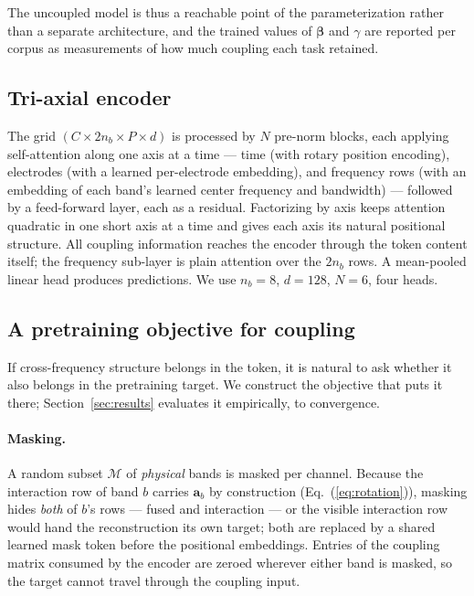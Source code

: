 The uncoupled model is thus a reachable point of the parameterization
rather than a separate architecture, and the trained values of
$\boldsymbol{\beta}$ and $\gamma$ are reported per corpus as measurements
of how much coupling each task retained.

\subsection{Tri-axial encoder}
\label{sec:encoder}

The grid $(C \times 2n_b \times P \times d)$ is processed by $N$ pre-norm
blocks, each applying self-attention along one axis at a time --- time
(with rotary position encoding), electrodes (with a learned per-electrode
embedding), and frequency rows (with an embedding of each band's learned
center frequency and bandwidth) --- followed by a feed-forward layer, each
as a residual. Factorizing by axis keeps attention quadratic in one short
axis at a time and gives each axis its natural positional structure. All
coupling information reaches the encoder through the token content itself;
the frequency sub-layer is plain attention over the $2n_b$ rows. A
mean-pooled linear head produces predictions. We use $n_b{=}8$, $d{=}128$,
$N{=}6$, four heads.

\subsection{A pretraining objective for coupling}
\label{sec:objective}

If cross-frequency structure belongs in the token, it is natural to ask
whether it also belongs in the pretraining target. We construct the
objective that puts it there; Section~\ref{sec:results} evaluates it
empirically, to convergence.

\paragraph{Masking.} A random subset $\mathcal{M}$ of \emph{physical}
bands is masked per channel. Because the interaction row of band $b$
carries $\mathbf{a}_b$ by construction (Eq.~(\ref{eq:rotation})), masking
hides \emph{both} of $b$'s rows --- fused and interaction --- or the
visible interaction row would hand the reconstruction its own target; both
are replaced by a shared learned mask token before the positional
embeddings. Entries of the coupling matrix consumed by the encoder are
zeroed wherever either band is masked, so the target cannot travel through
the coupling input.

